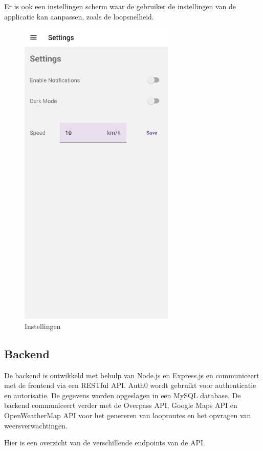     Er is ook een instellingen scherm waar de gebruiker de instellingen van de applicatie kan aanpassen, zoals de loopsnelheid.

    \begin{figure}[htbp]
        \includegraphics[width=20em]{./graphics/settings.png}
        \centering
        \caption{Instellingen}
        \label{fig:settings}
    \end{figure}


    \subsection{Backend}
    
    De backend is ontwikkeld met behulp van Node.js en Express.js en communiceert met de frontend via een RESTful API. 
    Auth0 wordt gebruikt voor authenticatie en autorisatie. De gegevens worden opgeslagen in een MySQL database. 
    De backend communiceert verder met de Overpass API, Google Maps API en OpenWeatherMap API voor het genereren van looproutes en het opvragen van weersverwachtingen.
    
    Hier is een overzicht van de verschillende endpoints van de API.
    
